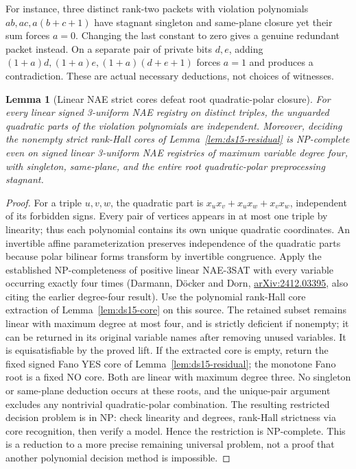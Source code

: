 \documentclass[11pt]{article}
\newtheorem{lemma}[theorem]{Lemma}
\begin{document}
For instance, three distinct rank-two packets with violation polynomials $ab,ac,a(b+c+1)$ have stagnant singleton and same-plane closure yet their sum forces $a=0$. Changing the last constant to zero gives a genuine redundant packet instead. On a separate pair of private bits $d,e$, adding $(1+a)d,(1+a)e,(1+a)(d+e+1)$ forces $a=1$ and produces a contradiction. These are actual necessary deductions, not choices of witnesses.

\begin{lemma}[Linear NAE strict cores defeat root quadratic-polar closure]\label{lem:ba15-core}
For every linear signed 3-uniform NAE registry on distinct triples, the unguarded quadratic parts of the violation polynomials are independent. Moreover, deciding the nonempty strict rank-Hall cores of Lemma~\ref{lem:ds15-residual} is NP-complete even on signed linear 3-uniform NAE registries of maximum variable degree four, with singleton, same-plane, and the entire root quadratic-polar preprocessing stagnant.
\end{lemma}
\begin{proof}
For a triple $u,v,w$, the quadratic part is $x_u x_v+x_u x_w+x_v x_w$, independent of its forbidden signs. Every pair of vertices appears in at most one triple by linearity; thus each polynomial contains its own unique quadratic coordinates. An invertible affine parameterization preserves independence of the quadratic parts because polar bilinear forms transform by invertible congruence. Apply the established NP-completeness of positive linear NAE-3SAT with every variable occurring exactly four times (Darmann, D\"ocker and Dorn, \href{https://arxiv.org/abs/2412.03395}{arXiv:2412.03395}, also citing the earlier degree-four result). Use the polynomial rank-Hall core extraction of Lemma~\ref{lem:ds15-core} on this source. The retained subset remains linear with maximum degree at most four, and is strictly deficient if nonempty; it can be returned in its original variable names after removing unused variables. It is equisatisfiable by the proved lift. If the extracted core is empty, return the fixed signed Fano YES core of Lemma~\ref{lem:ds15-residual}; the monotone Fano root is a fixed NO core. Both are linear with maximum degree three. No singleton or same-plane deduction occurs at these roots, and the unique-pair argument excludes any nontrivial quadratic-polar combination. The resulting restricted decision problem is in NP: check linearity and degrees, rank-Hall strictness via core recognition, then verify a model. Hence the restriction is NP-complete. This is a reduction to a more precise remaining universal problem, not a proof that another polynomial decision method is impossible.
\end{proof}
\end{document}
